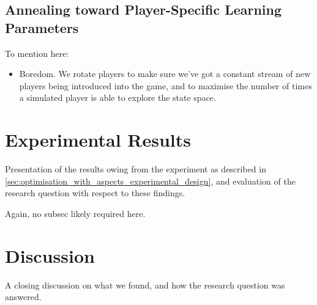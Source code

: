 \subsection{Annealing toward Player-Specific Learning Parameters}



To mention here:
\begin{itemize}
  \item Boredom. We rotate players to make sure we've got a constant stream of
  new players being introduced into the game, and to maximise the number of
  times a simulated player is able to explore the state space.
\end{itemize}



\section{Experimental Results}
\label{sec:optimisation_with_aspects_experimental_results}

Presentation of the results owing from the experiment as described in
\cref{sec:optimisation_with_aspects_experimental_design}, and evaluation of the
research question with respect to these findings.

Again, no subsec likely required here.

\section{Discussion}
\label{sec:optimisation_with_aspects_discussion}

A closing discussion on what we found, and how the research question was
answered.